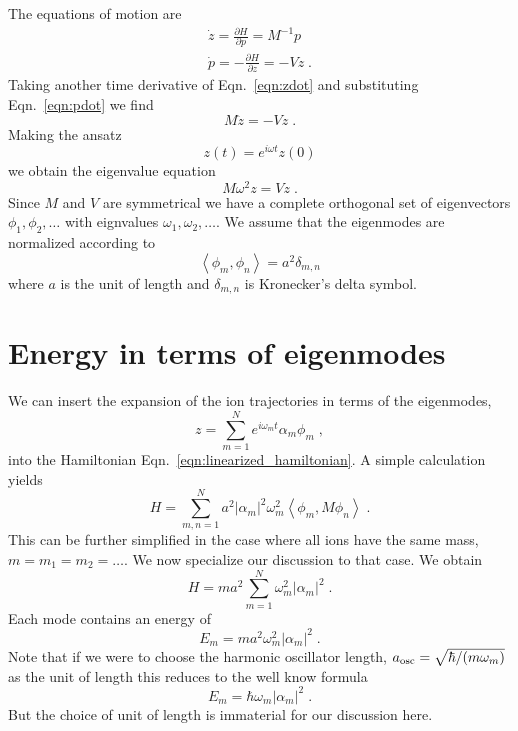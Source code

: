 \documentclass[aps, pra, preprint]{revtex4-1}
\begin{document}
The equations of motion are
\begin{eqnarray}
  \dot{z} = \frac{\partial H}{\partial p} = M^{-1}p\label{eqn:zdot}\\
  \dot{p} = -\frac{\partial H}{\partial z} = -Vz\label{eqn:pdot}\;.
\end{eqnarray}
Taking another time derivative of Eqn.~\eqref{eqn:zdot} and
substituting Eqn.~\eqref{eqn:pdot} we find
\begin{equation}
  M\ddot{z}=-Vz\;.
\end{equation}
Making the ansatz
\begin{equation}
  z(t)=e^{i\omega t}z(0)
\end{equation}
we obtain the eigenvalue equation
\begin{equation}
  M\omega^2z = Vz\;.
\end{equation}
Since $M$ and $V$ are symmetrical we have a complete orthogonal
set of eigenvectors $\phi_1, \phi_2,\ldots$ with eignvalues
$\omega_1, \omega_2, \ldots$. We assume that the eigenmodes are
normalized according to
\begin{equation}
  \left\langle \phi_m,\phi_n\right \rangle = a^2\delta_{m,n}
\end{equation}
where $a$ is the unit of length and $\delta_{m,n}$ is Kronecker's
delta symbol.


\section{Energy in terms of eigenmodes}

We can insert the expansion of the ion trajectories in terms of the
eigenmodes,
\begin{equation}
  z=\sum_{m=1}^N e^{i\omega_m t} \alpha_m \phi_m\;,
\end{equation}
into the Hamiltonian Eqn.~\eqref{eqn:linearized_hamiltonian}. A
simple calculation yields
\begin{equation}
  H=\sum_{m,n=1}^Na^2\left| \alpha_m\right|^2\omega_m^2\left\langle \phi_m,M\phi_n \right\rangle\;.
\end{equation}
This can be further simplified in the case where all ions
have the same mass, $m=m_1=m_2=\ldots$. We now specialize our
discussion to that case. We obtain
\begin{equation}
  H=ma^2\sum_{m=1}^N\omega_m^2\left| \alpha_m \right|^2\;.
\end{equation}
Each mode contains an energy of
\begin{equation}
  E_m=ma^2\omega_m^2\left| \alpha_m \right|^2\;.
\end{equation}
Note that if we were to choose the harmonic oscillator length,
$a_{\rm osc}=\sqrt{\hbar/(m\omega_m)}$ as the unit of length this
reduces to the well know formula
\begin{equation}
  E_m=\hbar\omega_m\left| \alpha_m \right|^2\;.
\end{equation}
But the choice of unit of length is immaterial for our discussion here.
\end{document}
